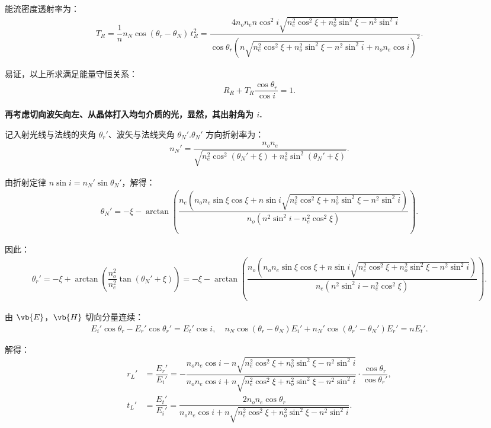 能流密度透射率为：
\begin{align*}
	T_R = \dfrac{1}{n} n_N \cos(\theta_r - \theta_N) \,t_R^2 = \dfrac{4 n_o n_e n \cos^2 i \sqrt{n_e^2 \cos^2\xi + n_o^2 \sin^2\xi - n^2 \sin^2 i}}{\cos\theta_r \left( n \sqrt{n_e^2 \cos^2\xi + n_o^2 \sin^2\xi - n^2 \sin^2 i} + n_o n_e \cos i \right)^2}.
\end{align*}

易证，以上所求满足能量守恒关系：
\begin{align*}
	R_R + T_R \dfrac{\cos\theta_r}{\cos i} = 1.
\end{align*}

\textbf{再考虑切向波矢向左、从晶体打入均匀介质的光，显然，其出射角为 \(i\).}

记入射光线与法线的夹角 \(\theta_r'\)、波矢与法线夹角 \(\theta_N'\).\(\theta_N'\) 方向折射率为：
\begin{align*}
	n_N' = \dfrac{n_o n_e}{\sqrt{n_e^2 \cos^2(\theta_N' + \xi) + n_o^2 \sin^2(\theta_N' + \xi)}}.
\end{align*}

由折射定律 \(n \sin i = n_N' \sin \theta_N'\)，解得：
\begin{align*}
	\theta_N' = -\xi - \arctan\left( \dfrac{n_e \left( n_o n_e \sin\xi \cos\xi + n \sin i \sqrt{n_e^2 \cos^2\xi + n_o^2 \sin^2\xi - n^2 \sin^2 i} \right)}{n_o \left( n^2 \sin^2 i - n_e^2 \cos^2\xi \right)} \right).
\end{align*}

因此：
\begin{align*}
	\theta_r' = -\xi + \arctan\left( \dfrac{n_o^2}{n_e^2} \tan(\theta_N' + \xi) \right) = -\xi - \arctan\left( \dfrac{n_o \left( n_o n_e \sin\xi \cos\xi + n \sin i \sqrt{n_e^2 \cos^2\xi + n_o^2 \sin^2\xi - n^2 \sin^2 i} \right)}{n_e \left( n^2 \sin^2 i - n_e^2 \cos^2\xi \right)} \right).
\end{align*}

由 \(\vb{E}\)，\(\vb{H}\) 切向分量连续：
\begin{align*}
	E_i' \cos\theta_r - E_r' \cos\theta_r' = E_t' \cos i,\quad
	n_N \cos(\theta_r - \theta_N) E_i' + n_N' \cos(\theta_r' - \theta_N') E_r' = n E_t'.
\end{align*}

解得：
\begin{align*}
	r_L' & = \dfrac{E_r'}{E_i'} = -\dfrac{ n_o n_e \cos i - n \sqrt{n_e^2 \cos^2\xi + n_o^2 \sin^2\xi - n^2 \sin^2 i} }{ n_o n_e \cos i + n \sqrt{n_e^2 \cos^2\xi + n_o^2 \sin^2\xi - n^2 \sin^2 i} } \cdot \dfrac{\cos\theta_r}{\cos\theta_r'}, \\
	t_L' & = \dfrac{E_t'}{E_i'} = \dfrac{2 n_o n_e \cos\theta_r}{n_o n_e \cos i + n \sqrt{n_e^2 \cos^2\xi + n_o^2 \sin^2\xi - n^2 \sin^2 i}}.
\end{align*}

